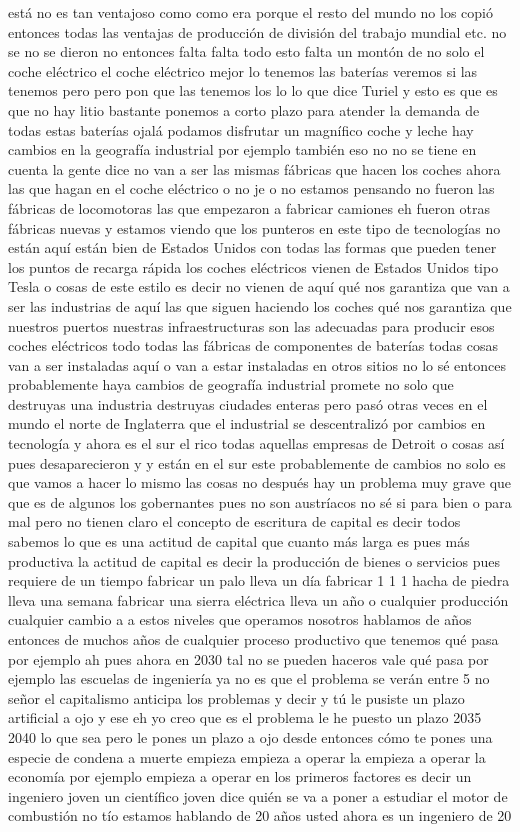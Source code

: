 está no es tan ventajoso como como era porque el resto del mundo no los copió entonces todas las ventajas de producción de división del trabajo mundial etc. no se no se dieron no entonces falta falta todo esto falta un montón de no solo el coche eléctrico el coche eléctrico mejor lo tenemos las baterías veremos si las tenemos pero pero pon que las tenemos los lo lo que dice Turiel y esto es que es que no hay litio bastante ponemos a corto plazo para atender la demanda de todas estas baterías ojalá podamos disfrutar un magnífico coche y leche hay cambios en la geografía industrial por ejemplo también eso no no se tiene en cuenta la gente dice no van a ser las mismas fábricas que hacen los coches ahora las que hagan en el coche eléctrico o no je o no estamos pensando no fueron las fábricas de locomotoras las que empezaron a fabricar camiones eh fueron otras fábricas nuevas y estamos viendo que los punteros en este tipo de tecnologías no están aquí están bien de Estados Unidos con todas las formas que pueden tener los puntos de recarga rápida los coches eléctricos vienen de Estados Unidos tipo Tesla o cosas de este estilo es decir no vienen de aquí qué nos garantiza que van a ser las industrias de aquí las que siguen haciendo los coches qué nos garantiza que nuestros puertos nuestras infraestructuras son las adecuadas para producir esos coches eléctricos todo todas las fábricas de componentes de baterías todas cosas van a ser instaladas aquí o van a estar instaladas en otros sitios no lo sé entonces probablemente haya cambios de geografía industrial promete no solo que destruyas una industria destruyas ciudades enteras pero pasó otras veces en el mundo el norte de Inglaterra que el industrial se descentralizó por cambios en tecnología y ahora es el sur el rico todas aquellas empresas de Detroit o cosas así pues desaparecieron y y están en el sur este probablemente de cambios no solo es que vamos a hacer lo mismo las cosas no después hay un problema muy grave que que es de algunos los gobernantes pues no son austríacos no sé si para bien o para mal pero no tienen claro el concepto de escritura de capital es decir todos sabemos lo que es una actitud de capital que cuanto más larga es pues más productiva la actitud de capital es decir la producción de bienes o servicios pues requiere de un tiempo fabricar un palo lleva un día fabricar 1 1 1 hacha de piedra lleva una semana fabricar una sierra eléctrica lleva un año o cualquier producción cualquier cambio a a estos niveles que operamos nosotros hablamos de años entonces de muchos años de cualquier proceso productivo que tenemos qué pasa por ejemplo ah pues ahora en 2030 tal no se pueden haceros vale qué pasa por ejemplo las escuelas de ingeniería ya no es que el problema se verán entre 5 no señor el capitalismo anticipa los problemas y decir y tú le pusiste un plazo artificial a ojo y ese eh yo creo que es el problema le he puesto un plazo 2035 2040 lo que sea pero le pones un plazo a ojo desde entonces cómo te pones una especie de condena a muerte empieza empieza a operar la empieza a operar la economía por ejemplo empieza a operar en los primeros factores es decir un ingeniero joven un científico joven dice quién se va a poner a estudiar el motor de combustión no tío estamos hablando de 20 años usted ahora es un ingeniero de 20 